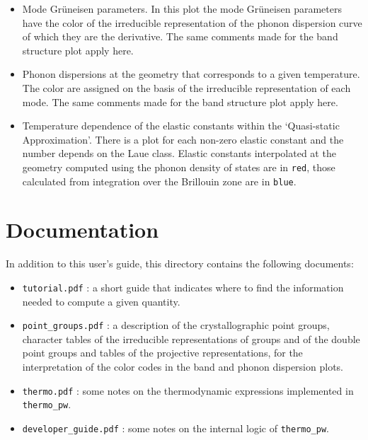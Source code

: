 \documentclass[12pt,a4paper]{article}
\begin{document}
\begin{itemize}
\item
Mode Gr\"uneisen parameters. In this plot the mode Gr\"uneisen parameters have
the color of the irreducible representation of the phonon dispersion curve
of which they are the derivative.
The same comments made for the band structure plot apply here.

\item
Phonon dispersions at the geometry that corresponds to a given temperature. 
The color are assigned on the basis of the irreducible representation of
each mode. The same comments made for the band structure plot apply here.

\item
Temperature dependence of the elastic constants within the 
`Quasi-static Approximation'. There is a plot for each non-zero
elastic constant and the number depends on the Laue class. Elastic constants 
interpolated at the geometry computed using the phonon density of states 
are in \texttt{red}, those calculated from integration over the 
Brillouin zone are in \texttt{blue}.

\end{itemize}

\newpage
\section{\color{coral}Documentation}

In addition to this user's guide, this directory contains the following
documents:

\begin{itemize}

\item
\texttt{tutorial.pdf} : a short guide that indicates where to find the
information needed to compute a given quantity. 

\item
\texttt{point\_groups.pdf} : a description of the crystallographic point 
groups, character tables of the irreducible representations of groups and 
of the double point groups and tables of the projective representations, 
for the interpretation of the color codes in the band and phonon dispersion 
plots.

\item
\texttt{thermo.pdf} : some notes on the thermodynamic expressions implemented
in \texttt{thermo\_pw}.

\item
\texttt{developer\_guide.pdf} : some notes on the internal logic of
\texttt{thermo\_pw}.

\end{itemize}
\end{document}
